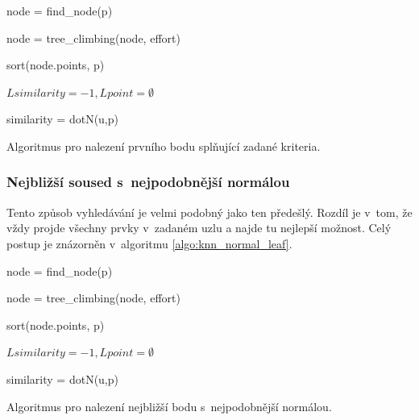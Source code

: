 \begin{algorithm}
    \SetAlgoLined

    node = find\_node(p)\;
    
    node = tree\_climbing(node, effort) \;

    sort(node.points, p)



    $Lsimilarity = -1,  Lpoint = \emptyset$ \;
    
     {
        similarity = dotN(u,p)
        

    }
    
    \caption{Algoritmus pro nalezení prvního bodu splňující zadané kriteria.}
    \label{algo:firt_knn_normal}
\end{algorithm}

\subsubsection{Nejbližší soused s~nejpodobnější normálou}
Tento způsob vyhledávání je velmi podobný jako ten předešlý. Rozdíl je v~tom, že vždy projde všechny prvky v~zadaném uzlu a najde tu nejlepší možnost. Celý postup je znázorněn v~algoritmu \ref{algo:knn_normal_leaf}.

\begin{algorithm}
    \SetAlgoLined

    node = find\_node(p)\;
    
    node = tree\_climbing(node, effort) \;

    sort(node.points, p)



    $Lsimilarity = -1,  Lpoint = \emptyset$ \;
    
     {
        similarity = dotN(u,p)
        

    }
    
    \caption{Algoritmus pro nalezení nejbližší bodu s~nejpodobnější normálou.}
    \label{algo:knn_normal_leaf}
\end{algorithm}

